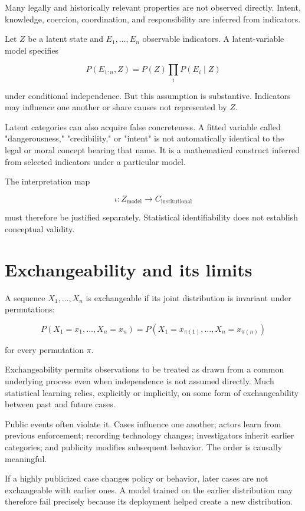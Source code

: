 Many legally and historically relevant properties are not observed directly. Intent, knowledge, coercion, coordination, and responsibility are inferred from indicators.

Let \(Z\) be a latent state and \(E_1,\ldots,E_n\) observable indicators. A latent-variable model specifies

\[
P(E_{1:n},Z)
=
P(Z)\prod_iP(E_i\mid Z)
\]

under conditional independence. But this assumption is substantive. Indicators may influence one another or share causes not represented by \(Z\).

Latent categories can also acquire false concreteness. A fitted variable called "dangerousness," "credibility," or "intent" is not automatically identical to the legal or moral concept bearing that name. It is a mathematical construct inferred from selected indicators under a particular model.

The interpretation map

\[
\iota:Z_{\mathrm{model}}\to C_{\mathrm{institutional}}
\]

must therefore be justified separately. Statistical identifiability does not establish conceptual validity.

\section{Exchangeability and its limits}
\label{sec:a40}

A sequence \(X_1,\ldots,X_n\) is exchangeable if its joint distribution is invariant under permutations:

\[
P(X_1=x_1,\ldots,X_n=x_n)
=
P(X_1=x_{\pi(1)},\ldots,X_n=x_{\pi(n)})
\]

for every permutation \(\pi\).

Exchangeability permits observations to be treated as drawn from a common underlying process even when independence is not assumed directly. Much statistical learning relies, explicitly or implicitly, on some form of exchangeability between past and future cases.

Public events often violate it. Cases influence one another; actors learn from previous enforcement; recording technology changes; investigators inherit earlier categories; and publicity modifies subsequent behavior. The order is causally meaningful.

If a highly publicized case changes policy or behavior, later cases are not exchangeable with earlier ones. A model trained on the earlier distribution may therefore fail precisely because its deployment helped create a new distribution.

